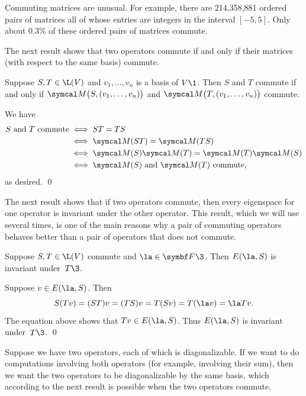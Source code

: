
Commuting matrices are unusual. For example, there are 214,358,881 ordered pairs of  matrices all of whose entries are integers in the interval $[-5,5]$. Only about 0.3\% of these ordered pairs of matrices commute.

\pagebreak[3]

The next result shows that two operators commute if and only if their matrices (with respect to the same basis) commute.

{Suppose $S, T \in \L(V)$ and $v_1, \ldots, v_n$ is a basis of $V\1$. Then $S$ and $T$ commute if and only if
$\M\paren[\big]{ S, (v_1, \ldots, v_n) }$ and $\M\paren[\big]{ T, (v_1, \ldots, v_n) }$ commute.}

\proof
We have
\begin{align*}
S \text{ and } T \text{ commute} & \iff ST = TS \\
&\iff \M(ST) = \M(TS) \\
&\iff \M(S) \M(T) = \M(T) \M(S) \\
& \iff \M(S) \text{ and } \M(T) \text{ commute},
\end{align*}
as desired.
\qed

The next result shows that if two operators commute, then every eigenspace for one operator is invariant under the other operator. This result, which we will use several times, is one of the main reasons why a pair of commuting operators behaves better than a pair of operators that does not commute.

{Suppose $S, T \in \L(V)$ commute and $\la \in \F{}\3$. Then $E(\la, S)$ is invariant under~$T\3$.}

\proof
Suppose $v \in E(\la, S)$. Then
\[
S( Tv ) = (ST)v = (TS)v = T(Sv) = T(\la v) = \la Tv.
\]
The equation above shows that $Tv \in E(\la, S)$. Thus $E(\la, S)$ is invariant under~$T\3$.
\qed

Suppose we have two operators, each of which is diagonalizable. If we want to do computations involving both operators (for example, involving their sum), then we want the two operators to be diagonalizable by the same basis, which according to the next result is possible when the two operators commute.

